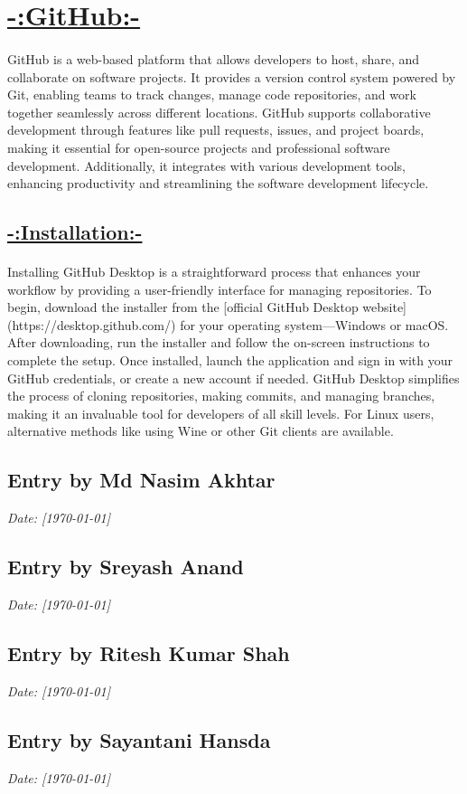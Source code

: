 \documentclass[a4paper,12pt]{article}
\begin{document}
\section*{\Huge{\underline{{-:GitHub:-}}}}
\paragraph{\noindent}{GitHub is a web-based platform that allows developers to host, share, and collaborate on software projects. It provides a version control system powered by Git, enabling teams to track changes, manage code repositories, and work together seamlessly across different locations. GitHub supports collaborative development through features like pull requests, issues, and project boards, making it essential for open-source projects and professional software development. Additionally, it integrates with various development tools, enhancing productivity and streamlining the software development lifecycle.}

\subsection*{\underline{-:Installation:-}}
\paragraph{\setlength{\parindent}{0pt}}{Installing GitHub Desktop is a straightforward process that enhances your workflow by providing a user-friendly interface for managing repositories. To begin, download the installer from the [official GitHub Desktop website](https://desktop.github.com/) for your operating system—Windows or macOS. After downloading, run the installer and follow the on-screen instructions to complete the setup. Once installed, launch the application and sign in with your GitHub credentials, or create a new account if needed. GitHub Desktop simplifies the process of cloning repositories, making commits, and managing branches, making it an invaluable tool for developers of all skill levels. For Linux users, alternative methods like using Wine or other Git clients are available.}

\subsection*{Entry by Md Nasim Akhtar}
\textit{Date: [\today]}\\

\subsection*{Entry by Sreyash Anand}
\textit{Date: [\today]}\\

\subsection*{Entry by Ritesh Kumar Shah}
\textit{Date: [\today]}\\

\subsection*{Entry by Sayantani Hansda}
\textit{Date: [\today]}\\
\end{document}
